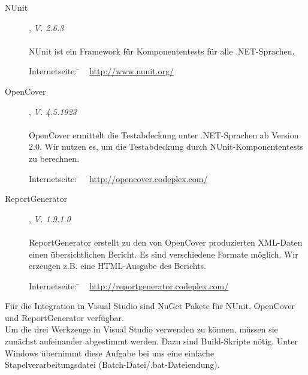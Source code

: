 \begin{description}

	\item[NUnit], \textit{V. 2.6.3}\hfill
	\\
	\\
	NUnit ist ein Framework für Komponententests für alle .NET-Sprachen.
	
	\begin{tabbing}
		Internetseite:
		\= ~ \href {http://www.nunit.org/}
	    	       {http://www.nunit.org/}
	    \\
	\end{tabbing}
	
	
	\item[OpenCover], \textit{V. 4.5.1923}\hfill
	\\
	\\
	OpenCover ermittelt die Testabdeckung unter .NET-Sprachen ab Version 2.0. Wir nutzen es, um die Testabdeckung durch NUnit-Komponententests zu berechnen.
	
	\begin{tabbing}
		Internetseite:
		\= ~ \href {http://opencover.codeplex.com/}
	    	       {http://opencover.codeplex.com/}
	    \\
	\end{tabbing}
	
	
	\item[ReportGenerator], \textit{V. 1.9.1.0}\hfill
	\\
	\\
	ReportGenerator erstellt zu den von OpenCover produzierten XML-Daten einen übersichtlichen Bericht. Es sind verschiedene Formate möglich. Wir erzeugen z.B. eine HTML-Ausgabe des Berichts.
	\begin{tabbing}
			Internetseite:
			\= ~ \href {http://reportgenerator.codeplex.com/}
		    	       {http://reportgenerator.codeplex.com/}
		    \\
	\end{tabbing}

\end{description}

Für die Integration in Visual Studio sind NuGet Pakete für NUnit, OpenCover und ReportGenerator verfügbar.\\
Um die drei Werkzeuge in Visual Studio verwenden zu können, müssen sie zunächst aufeinander abgestimmt werden. Dazu sind  Build-Skripte nötig. Unter Windows übernimmt diese Aufgabe bei uns eine einfache Stapelverarbeitungsdatei (Batch-Datei/.bat-Dateiendung).\\

